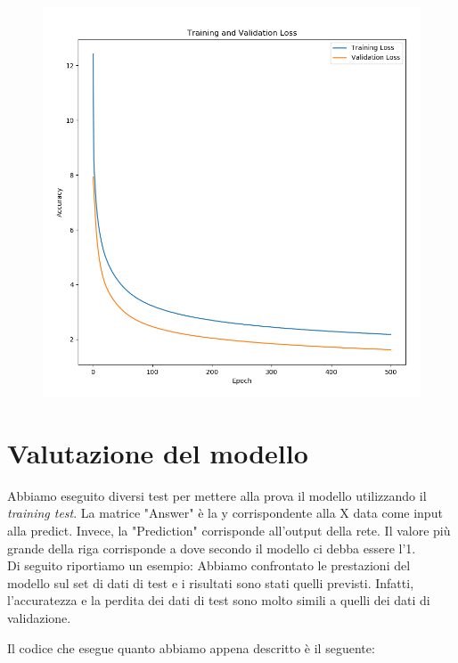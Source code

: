 \begin{figure}[H]
	\centering
	\includegraphics[scale=0.50]{./images/plot2.png}
\end{figure}

\section{Valutazione del modello}
Abbiamo eseguito diversi test per mettere alla prova il modello utilizzando il \textit{training test}. La matrice "Answer" è la y corrispondente alla X data come input alla predict. Invece, la "Prediction" corrisponde all'output della rete. Il valore più grande della riga corrisponde a dove secondo il modello ci debba essere l'1.\\
\newline
Di seguito riportiamo un esempio:
\vspace*{2ex}
\vspace*{2ex}
Abbiamo confrontato le prestazioni del modello sul set di dati di test e i risultati sono stati quelli previsti. Infatti, l'accuratezza e la perdita dei dati di test sono molto simili a quelli dei dati di validazione.
\vspace*{2ex}
\vspace*{2ex}

Il codice che esegue quanto abbiamo appena descritto è il seguente:
\vspace*{2ex}
\vspace*{2ex}